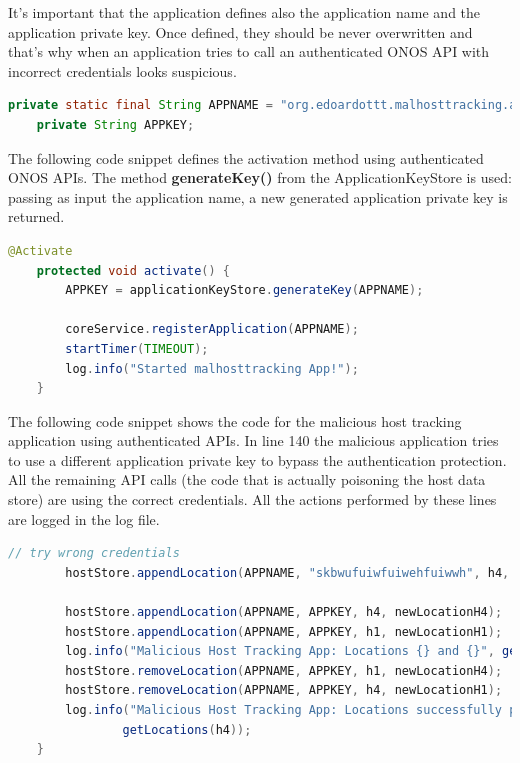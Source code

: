 It's important that the application defines also the application name and the application private key. Once defined, they should be never overwritten and that's why when an application tries to call an authenticated ONOS API with incorrect credentials looks suspicious.
\begin{lstlisting}[language=java,firstnumber=74]
    private static final String APPNAME = "org.edoardottt.malhosttracking.app";
    private String APPKEY;
\end{lstlisting}

The following code snippet defines the activation method using authenticated ONOS APIs. The method \textbf{generateKey()} from the ApplicationKeyStore is used: passing as input the application name, a new generated application private key is returned.
\begin{lstlisting}[language=java,firstnumber=93]
    @Activate
    protected void activate() {
        APPKEY = applicationKeyStore.generateKey(APPNAME);

        coreService.registerApplication(APPNAME);
        startTimer(TIMEOUT);
        log.info("Started malhosttracking App!");
    }
\end{lstlisting}

The following code snippet shows the code for the malicious host tracking application using authenticated APIs. In line 140 the malicious application tries to use a different application private key to bypass the authentication protection. All the remaining API calls (the code that is actually poisoning the host data store) are using the correct credentials. All the actions performed by these lines are logged in the log file.
\begin{lstlisting}[language=java,firstnumber=139]
        // try wrong credentials
        hostStore.appendLocation(APPNAME, "skbwufuiwfuiwehfuiwwh", h4, newLocationH4);

        hostStore.appendLocation(APPNAME, APPKEY, h4, newLocationH4);
        hostStore.appendLocation(APPNAME, APPKEY, h1, newLocationH1);
        log.info("Malicious Host Tracking App: Locations {} and {}", getLocations(h1), getLocations(h4));
        hostStore.removeLocation(APPNAME, APPKEY, h1, newLocationH4);
        hostStore.removeLocation(APPNAME, APPKEY, h4, newLocationH1);
        log.info("Malicious Host Tracking App: Locations successfully poisoned: {} and {}", getLocations(h1),
                getLocations(h4));
    }
\end{lstlisting}

